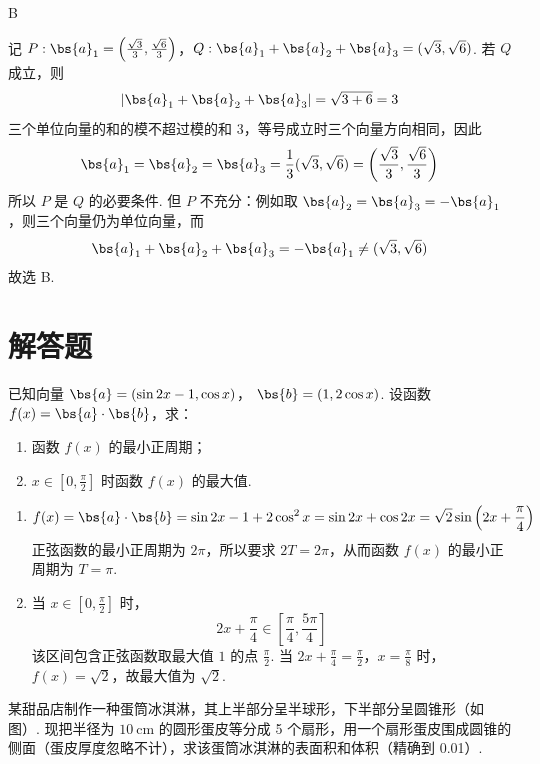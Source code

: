 \begin{answer}
B
\end{answer}

\begin{solution}
记
\(P:\bs{a}_1=\left(\frac{\sqrt{3}}{3},\frac{\sqrt{6}}{3}\right)\)，\(Q:\bs{a}_1+\bs{a}_2+\bs{a}_3=(\sqrt{3},\sqrt{6})\).
若 \(Q\) 成立，则
\[
|\bs{a}_1+\bs{a}_2+\bs{a}_3|=\sqrt{3+6}=3
\]
三个单位向量的和的模不超过模的和 \(3\)，等号成立时三个向量方向相同，因此
\[
\bs{a}_1=\bs{a}_2=\bs{a}_3
 =\frac{1}{3}(\sqrt{3},\sqrt{6})
 =\left(\frac{\sqrt{3}}{3},\frac{\sqrt{6}}{3}\right)
\]
所以 \(P\) 是 \(Q\) 的必要条件. 但 \(P\) 不充分：例如取 \(\bs{a}_2=\bs{a}_3=-\bs{a}_1\)，则三个向量仍为单位向量，而
\[
\bs{a}_1+\bs{a}_2+\bs{a}_3=-\bs{a}_1\ne(\sqrt{3},\sqrt{6})
\]
故选 B.
\end{solution}

\section{解答题}

\begin{problem}
已知向量 \( \bs{a} = (\sin 2x - 1, \cos x) \)， \( \bs{b} = (1, 2\cos x) \). 设函数 \( f(x) = \bs{a} \cdot \bs{b} \)，求：
\begin{enumerate}
\item 函数 \( f(x) \) 的最小正周期；
\item \( x \in \left[0, \frac{\pi}{2}\right] \) 时函数 \( f(x) \) 的最大值.
\end{enumerate}
\end{problem}

\begin{solution}
\begin{enumerate}
\item
\[
f(x)=\bs{a}\cdot\bs{b}
=\sin2x-1+2\cos^2x
=\sin2x+\cos2x
 =\sqrt{2}\sin\left(2x+\frac{\pi}{4}\right)
\]
正弦函数的最小正周期为 \(2\pi\)，所以要求 \(2T=2\pi\)，从而函数 \(f(x)\) 的最小正周期为 \(T=\pi\).

\item
当 \(x\in\left[0,\frac{\pi}{2}\right]\) 时，
\[
2x+\frac{\pi}{4}\in\left[\frac{\pi}{4},\frac{5\pi}{4}\right]
\]
该区间包含正弦函数取最大值 \(1\) 的点 \(\frac{\pi}{2}\). 当
\(2x+\frac{\pi}{4}=\frac{\pi}{2}\)，\(x=\frac{\pi}{8}\)
时，\(f(x)=\sqrt{2}\)，故最大值为 \(\sqrt{2}\).
\end{enumerate}
\end{solution}

\begin{problem}
某甜品店制作一种蛋筒冰淇淋，其上半部分呈半球形，下半部分呈圆锥形（如图）. 现把半径为 \(10\mathrm{~cm}\) 的圆形蛋皮等分成 5 个扇形，用一个扇形蛋皮围成圆锥的侧面（蛋皮厚度忽略不计），求该蛋筒冰淇淋的表面积和体积（精确到 0.01）.

\end{problem}

